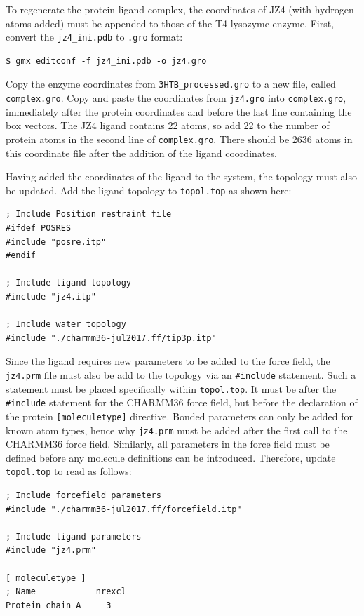 \documentclass[9pt,tutorial,pubversion]{livecoms}
\begin{document}
To regenerate the protein-ligand complex, the coordinates of JZ4 (with hydrogen atoms added) must be appended to those of the T4 lysozyme enzyme. First, convert the \texttt{jz4\_ini.pdb} to \texttt{.gro} format:

\begin{lstlisting}
$ gmx editconf -f jz4_ini.pdb -o jz4.gro
\end{lstlisting}

Copy the enzyme coordinates from \texttt{3HTB\_processed.gro} to a new file, called \texttt{complex.gro}. Copy and paste the coordinates from \texttt{jz4.gro} into \texttt{complex.gro}, immediately after the protein coordinates and before the last line containing the box vectors. The JZ4 ligand contains 22 atoms, so add 22 to the number of protein atoms in the second line of \texttt{complex.gro}. There should be 2636 atoms in this coordinate file after the addition of the ligand coordinates.

Having added the coordinates of the ligand to the system, the topology must also be updated. Add the ligand topology to \texttt{topol.top} as shown here:

\begin{lstlisting}
; Include Position restraint file
#ifdef POSRES
#include "posre.itp"
#endif

; Include ligand topology
#include "jz4.itp"

; Include water topology
#include "./charmm36-jul2017.ff/tip3p.itp"
\end{lstlisting}

Since the ligand requires new parameters to be added to the force field, the \texttt{jz4.prm} file must also be add to the topology via an \texttt{\#include} statement. Such a statement must be placed specifically within \texttt{topol.top}. It must be after the \texttt{\#include} statement for the CHARMM36 force field, but before the declaration of the protein \texttt{[moleculetype]} directive. Bonded parameters can only be added for known atom types, hence why \texttt{jz4.prm} must be added after the first call to the CHARMM36 force field. Similarly, all parameters in the force field must be defined before any molecule definitions can be introduced. Therefore, update \texttt{topol.top} to read as follows:

\begin{lstlisting}[basicstyle=\footnotesize\ttfamily]
; Include forcefield parameters
#include "./charmm36-jul2017.ff/forcefield.itp"

; Include ligand parameters
#include "jz4.prm"

[ moleculetype ]
; Name            nrexcl
Protein_chain_A     3
\end{lstlisting}
\end{document}
